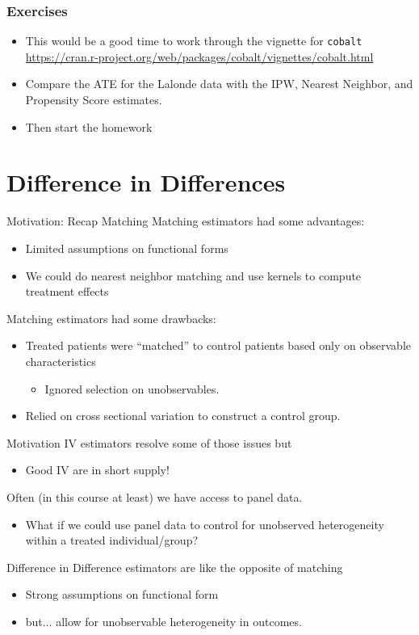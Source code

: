 \documentclass[aspectratio=169,11pt]{beamer}
\begin{document}
\begin{frame}
\frametitle{Exercises}
\begin{itemize}
\item This would be a good time to work through the vignette for \texttt{cobalt}
 \url{https://cran.r-project.org/web/packages/cobalt/vignettes/cobalt.html}
 \item Compare the ATE for the Lalonde data with the IPW, Nearest Neighbor, and Propensity Score estimates.
 \item Then start the homework
\end{itemize}
\end{frame}


\section{Difference in Differences}



\begin{frame}{Motivation: Recap Matching}
Matching estimators had some advantages:
\begin{itemize}
\item Limited assumptions on \alert{functional forms}
\item We could do nearest neighbor matching and use kernels to compute treatment effects
\end{itemize}
Matching estimators had some drawbacks:
\begin{itemize}
\item Treated patients were ``matched'' to control patients based only on \alert{observable characteristics}
\begin{itemize}
\item Ignored \alert{selection on unobservables}.
\end{itemize}
\item Relied on \alert{cross sectional} variation to construct a control group.
\end{itemize}
\end{frame}


\begin{frame}{Motivation}
IV estimators resolve some of those issues but
\begin{itemize}
\item Good IV are in short supply!
\end{itemize}
 Often (in this course at least) we have access to \alert{panel data}.
\begin{itemize}
\item What if we could use panel data to control for \alert{unobserved heterogeneity} within a treated individual/group?
\end{itemize}
\alert{Difference in Difference} estimators are like the opposite of matching
\begin{itemize}
\item \alert{Strong} assumptions on \alert{functional form}
\item but... allow for \alert{unobservable heterogeneity} in outcomes.
\end{itemize}
\end{frame}
\end{document}
